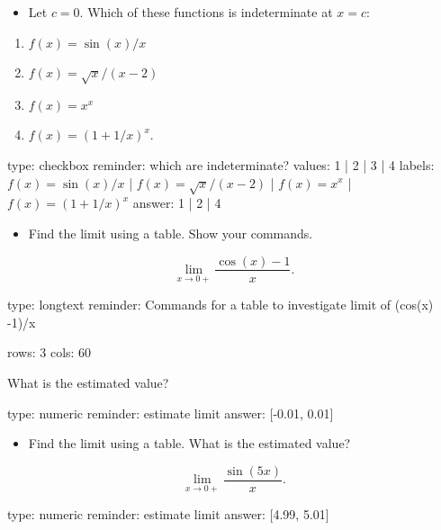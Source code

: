 \documentclass[12pt]{article}
\begin{document}
\begin{itemize}
\itemsep1pt\parskip0pt
\item
  Let $c=0$. Which of these functions is indeterminate at $x=c$:
\end{itemize}

\begin{enumerate}
\def\labelenumi{\arabic{enumi})}
\itemsep1pt\parskip0pt
\item
  $f(x) = \sin(x)/x$
\item
  $f(x) = \sqrt{x}/(x-2)$
\item
  $f(x) = x^x$
\item
  $f(x) = (1 + 1/x)^x$.
\end{enumerate}

\begin{answer}
type: checkbox
reminder: which are indeterminate?
values: 1 | 2 | 3 | 4
labels: \( f(x) = \sin(x)/x \) | \( f(x) = \sqrt{x}/(x-2) \) | \( f(x) = x^x \) | \( f(x) = (1 + 1/x)^x \)
answer: 1 | 2 | 4
\end{answer}

\begin{itemize}
\itemsep1pt\parskip0pt
\item
  Find the limit using a table. Show your commands.
\end{itemize}

\[
\lim_{x \rightarrow 0+} \frac{\cos(x) - 1}{x}.
\]

\begin{answer}
type: longtext
reminder: Commands for a table to investigate limit of (cos(x) -1)/x

rows: 3
cols: 60
\end{answer}

What is the estimated value?

\begin{answer}
    type: numeric
    reminder: estimate limit
    answer: [-0.01, 0.01]

\end{answer}

\begin{itemize}
\itemsep1pt\parskip0pt
\item
  Find the limit using a table. What is the estimated value?
\end{itemize}

\[
\lim_{x \rightarrow 0+} \frac{\sin(5x)}{x}.
\]

\begin{answer}
    type: numeric
    reminder: estimate limit
    answer: [4.99, 5.01]

\end{answer}
\end{document}
